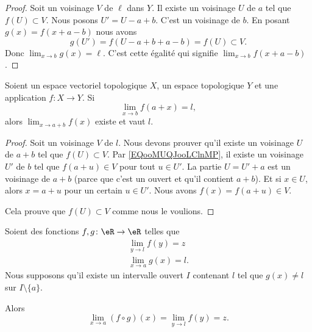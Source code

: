 \begin{proof}
	Soit un voisinage \( V\) de \( \ell\) dans \( Y\). Il existe un voisinage \( U\) de \( a\) tel que \( f(U)\subset V\). Nous posons \( U'=U-a+b\). C'est un voisinage de \( b\). En posant \( g(x)=f(x+a-b)\) nous avons
	\begin{equation}
		g(U')=f(U-a+b+a-b)=f(U)\subset V.
	\end{equation}
	Donc \( \lim_{x\to b}g(x)=\ell\). C'est cette égalité qui signifie \( \lim_{x\to b}f(x+a-b)\).
\end{proof}

\begin{proposition}	\label{PROPooXWNDooGHDXTa}
	Soient un espace vectoriel topologique \( X\), un espace topologique \( Y\) et une application \(f \colon X\to Y  \). Si
	\begin{equation}		\label{EQooMUQJooLClnMP}
		\lim_{x\to b}f(a+x)=l,
	\end{equation}
	alors \( \lim_{x\to a+b}f(x)\) existe et vaut \( l\).
\end{proposition}

\begin{proof}
	Soit un voisinage \( V\) de \( l\). Nous devons prouver qu'il existe un voisinage \( U\) de \( a+b\) tel que \( f(U)\subset V\). Par \eqref{EQooMUQJooLClnMP}, il existe un voisinage \( U'\) de \( b\) tel que \( f(a+u)\in V\) pour tout \( u\in U'\). La partie \( U=U'+a\) est un voisinage de \( a+b\) (parce que c'est un ouvert et qu'il contient \( a+b\)). Et si \( x\in U\), alors \( x=a+u\) pour un certain \( u\in U'\). Nous avons \( f(x)=f(a+u)\in V\).

	Cela prouve que \( f(U)\subset V\) comme nous le voulions.
\end{proof}


\begin{proposition}        \label{PROPooFGWXooFjvTYj}
	Soient des fonctions \( f,g\colon \eR\to \eR\) telles que
	\begin{subequations}
		\begin{align}
			\lim_{y\to l} f(y)=z \\
			\lim_{x\to a} g(x)=l.
		\end{align}
	\end{subequations}
	Nous supposons qu'il existe un intervalle ouvert \( I\) contenant \( l\) tel que \( g(x)\neq l\) sur \( I\setminus\{ a \}\).

	Alors
	\begin{equation}
		\lim_{x\to a} (f\circ g)(x)=\lim_{y\to l} f(y)=z.
	\end{equation}
\end{proposition}

